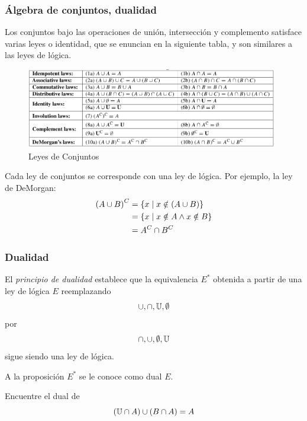 \documentclass[xcolor={svgnames},
  hyperref={colorlinks}, 
  spanish, 12pt]{beamer}
\numberwithin{equation}{section} %
\numberwithin{figure}{section} %
\begin{document}
\subsubsection{Álgebra de conjuntos, dualidad}

\begin{frame}
	Los conjuntos bajo las operaciones de unión, intersección y complemento satisface varias leyes o identidad, que se enuncian en la siguiente tabla, y son similares a las leyes de lógica.
\end{frame}

\begin{frame}
\begin{figure}
	\centering
	\includegraphics[width=11cm,keepaspectratio=true]{./leyes_conjuntos.png}
	\caption{Leyes de Conjuntos}
	\label{fig:leyesconjuntos}
\end{figure}

\end{frame}

\begin{frame}
	Cada ley de conjuntos se corresponde con una ley de lógica. Por ejemplo, la ley de DeMorgan:
	\begin{align*}
	\left(A \cup B\right)^{C} &= \left\{ x \mid x\notin(A \cup B) \right\}\\
	&= \left\{ x \mid x\notin A \wedge x\notin B \right\}\\
	&=A^{C}\cap B^{C}
	\end{align*}
\end{frame}

\begin{frame}
	\frametitle{Dualidad}
	El \emph{principio de dualidad} establece que la equivalencia $E^{*}$ obtenida a partir de una ley de lógica $E$ reemplazando
	\[ \cup, \cap, \mathbb{U}, \emptyset\] por
	\[ \cap, \cup, \emptyset, \mathbb{U}\]
	sigue siendo una ley de lógica.
	\pause
	
	A la proposición $E^{*}$ se le conoce como dual $E.$
\end{frame}

\begin{frame}
	\begin{exmp}
		Encuentre el dual de 
		\[ (\mathbb{U} \cap A) \cup (B\cap A) = A\]
	\end{exmp}
\end{frame}
\end{document}
